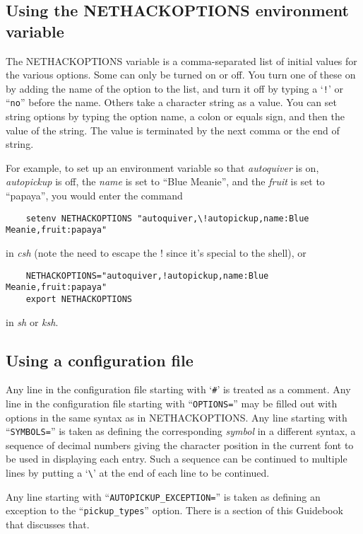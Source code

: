 \subsection*{Using the NETHACKOPTIONS environment variable}

The NETHACKOPTIONS variable is a comma-separated list of initial
values for the various options.  Some can only be turned on or off.
You turn one of these on by adding the name of the option to the list,
and turn it off by typing a `{\tt !}' or ``{\tt no}'' before the name.
Others take a
character string as a value.  You can set string options by typing
the option name, a colon or equals sign, and then the value of the string.
The value is terminated by the next comma or the end of string.

For example, to set up an environment variable so that {\it autoquiver\/}
is on, {\it autopickup\/} is off, the {\it name\/} is set to ``Blue Meanie'',
and the {\it fruit\/} is set to ``papaya'', you would enter the command
\begin{verbatim}
    setenv NETHACKOPTIONS "autoquiver,\!autopickup,name:Blue Meanie,fruit:papaya"
\end{verbatim}

\nd in {\it csh}
(note the need to escape the ! since it's special to the shell), or
\begin{verbatim}
    NETHACKOPTIONS="autoquiver,!autopickup,name:Blue Meanie,fruit:papaya"
    export NETHACKOPTIONS
\end{verbatim}

\nd in {\it sh\/} or {\it ksh}.

\subsection*{Using a configuration file}

Any line in the configuration file starting with `{\tt \#}' is treated as a comment.
Any line in the configuration file starting with ``{\tt OPTIONS=}'' may be
filled out with options in the same syntax as in NETHACKOPTIONS.
Any line starting with ``{\tt SYMBOLS=}''
is taken as defining the corresponding {\it symbol}
in a different syntax, a sequence of decimal numbers giving 
the character position in the current font to be used in displaying 
each entry. Such a sequence can be continued to multiple lines by putting a
`{\tt \verb+\+}' at the end of each line to be continued.

Any line starting with ``{\tt AUTOPICKUP\verb+_+EXCEPTION=}'' 
is taken as defining an exception to the ``{\tt pickup\verb+_+types}'' option.
There is a section of this Guidebook that discusses that.

